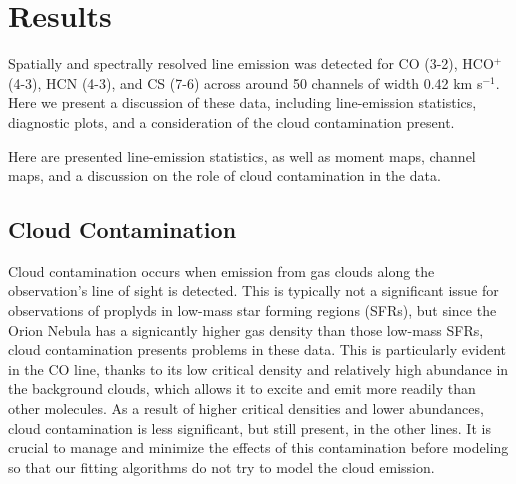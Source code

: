 \chapter{Results}
\label{chap:results}


Spatially and spectrally resolved line emission was detected for CO (3-2), HCO$^{+}$ (4-3), HCN (4-3), and CS (7-6) across around 50 channels of width 0.42 km s$^{-1}$. Here we present a discussion of these data, including line-emission statistics, diagnostic plots, and a consideration of the cloud contamination present.


Here are presented line-emission statistics, as well as moment maps, channel maps, and a discussion on the role of cloud contamination in the data.


\bigskip

\section{Cloud Contamination}
\label{section:cloud_contamination}

Cloud contamination occurs when emission from gas clouds along the observation's line of sight is detected. This is typically not a significant issue for observations of proplyds in low-mass star forming regions (SFRs), but since the Orion Nebula has a signicantly higher gas density than those low-mass SFRs, cloud contamination presents problems in these data. This is particularly evident in the CO line, thanks to its low critical density and relatively high abundance in the background clouds, which allows it to excite and emit more readily than other molecules. As a result of higher critical densities and lower abundances, cloud contamination is less significant, but still present, in the other lines. It is crucial to manage and minimize the effects of this contamination before modeling so that our fitting algorithms do not try to model the cloud emission.




